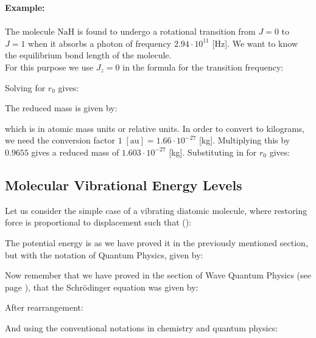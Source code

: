 	
	\begin{tcolorbox}[colframe=black,colback=white,sharp corners]
	\textbf{{\Large {}}Example:}\\\\
	The molecule $\mathrm{NaH}$ is found to undergo a rotational transition from  $J=0$ to $J=1$ when it absorbs a photon of frequency $2.94 \cdot 10^{11}$ [Hz]. We want to know the equilibrium bond length of the molecule.\\

	For this purpose we use $J_z=0$ in the formula for the transition frequency:
	
	Solving for $r_0$ gives:
	
	The reduced mass is given by:
	
	which is in atomic mass units or relative units. In order to convert to kilograms, we need the conversion factor $1\;[\text{au}]= 1.66\cdot 10^{-27}$ [kg]. Multiplying this by $0.9655$ gives a reduced mass of $1.603\cdot 10^{-27}$ [kg]. Substituting in for $r_0$ gives:
	
	\end{tcolorbox}

	\pagebreak
	\subsection{Molecular Vibrational Energy Levels}\label{molecular vibrations}
	Let us consider the simple case of a vibrating diatomic molecule, where restoring force is proportional to displacement such that ():
	
	The potential energy is as we have proved it in the previously mentioned section, but with the notation of Quantum Physics, given by:
	
	Now remember that we have proved in the section of Wave Quantum Physics (see page \pageref{schrodinger wave equation}), that the Schrödinger equation was given by:
	
	After rearrangement:
	
	And using the conventional notations in chemistry and quantum physics:
	
